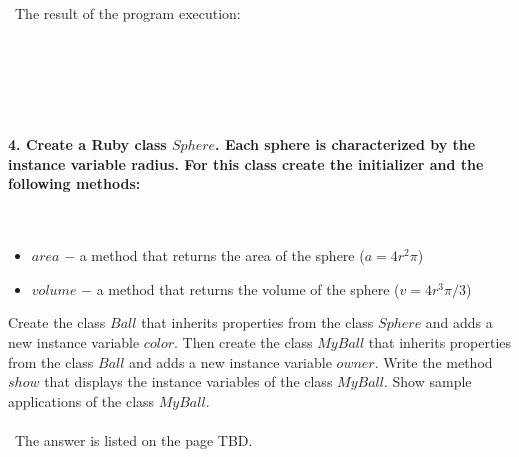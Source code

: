\documentclass{article}
\begin{document}
\begin{verbatim}

\end{verbatim}

\paragraph{}\
	The result of the program execution:
	
\begin{verbatim} 

\end{verbatim}


\paragraph{}\
\paragraph{}\



\paragraph{4. Create a Ruby class \(Sphere\). Each sphere is characterized by the instance variable radius. For this class create the initializer and the following methods: }\

	\begin{itemize}
		\item \(area\) \(-\) a method that returns the area of the sphere (\(a = 4r^2\pi\))
		\item \(volume\) \(-\) a method that returns the volume of the sphere (\(v = 4r^3\pi / 3\))
	\end{itemize}
	
	Create the class \(Ball\) that inherits properties from the class \(Sphere\) and adds a new instance variable \(color\). Then create the class \(MyBall\) that inherits properties from the class \(Ball\) and adds a new instance variable \(owner\). Write the method \(show\) that displays the instance variables of the class \(MyBall\). Show sample applications of the class \(MyBall\).

\paragraph{}\
	The answer is listed on the page TBD.
	
\paragraph{}\
\end{document}

